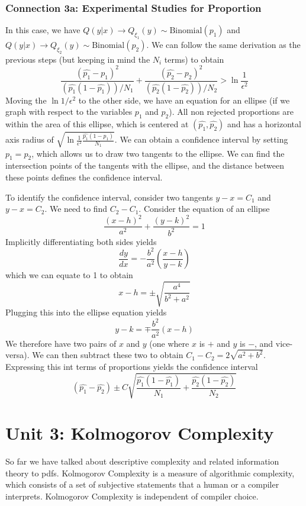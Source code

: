 \documentclass[11pt]{article}
\theoremstyle{definition}
\begin{document}
\subsubsection{Connection 3a: Experimental Studies for Proportion}

In this case, we have $Q(y|x) \rightarrow Q_{\xi_1}(y) \sim \text{Binomial}(p_1)$ and $Q(y|x) \rightarrow Q_{\xi_2}(y) \sim \text{Binomial}(p_2)$. We can follow the same derivation as the previous steps (but keeping in mind the $N_i$ terms) to obtain $$\frac{(\hat{p_1} - p_1)^2}{(\hat{p_1}(1 - \hat{p_1}))/N_1} + \frac{(\hat{p_2} - p_2)^2}{(\hat{p_2}(1 - \hat{p_2}))/N_2} > \ln \frac{1}{\epsilon^2}$$Moving the $\ln 1/ \epsilon^2$ to the other side, we have an equation for an ellipse (if we graph with respect to the variables $p_1$ and $p_2$). All non rejected proportions are within the area of this ellipse, which is centered at $(\hat{p_1}, \hat{p_2})$ and has a horizontal axis radius of $\sqrt{\ln \frac{1}{\epsilon^2} \frac{\hat{p_1}(1 - \hat{p_1})}{N_1}}$. We can obtain a confidence interval by setting $p_1 = p_2$, which allows us to draw two tangents to the ellipse. We can find the intersection points of the tangents with the ellipse, and the distance between these points defines the confidence interval. 

To identify the confidence interval, consider two tangents $y - x = C_1$ and $y - x = C_2$. We need to find $C_2 - C_1$. Consider the equation of an ellipse $$\frac{(x-h)^2}{a^2} + \frac{(y-k)^2}{b^2} = 1$$Implicitly differentiating both sides yields $$\frac{dy}{dx} = -\frac{b^2}{a^2} \left( \frac{x-h}{y-k} \right)$$which we can equate to 1 to obtain $$x-h = \pm \sqrt{\frac{a^4}{b^2 + a^2}}$$Plugging this into the ellipse equation yields $$y - k = \mp \frac{b^2}{a^2} (x-h)$$We therefore have two pairs of $x$ and $y$ (one where $x$ is $+$ and $y$ is $-$, and vice-versa). We can then subtract these two to obtain $C_1 - C_2 = 2 \sqrt{a^2 + b^2}$. Expressing this int terms of proportions yields the confidence interval $$(\hat{p_1} - \hat{p_2}) \pm C \sqrt{ \frac{\hat{p_1} ( 1 - \hat{p_1})}{N_1} + \frac{\hat{p_2} (1 - \hat{p_2})}{N_2}}$$

\section{Unit 3: Kolmogorov Complexity}

So far we have talked about descriptive complexity and related information theory to pdfs. Kolmogorov Complexity is a measure of algorithmic complexity, which consists of a set of subjective statements that a human or a compiler interprets. Kolmogorov Complexity is independent of compiler choice. 
\end{document}
